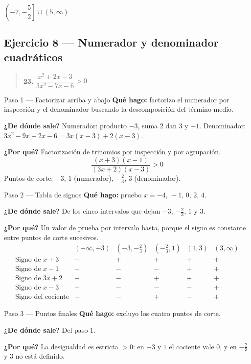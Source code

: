 \documentclass[11pt]{article}
\begin{document}
\begin{resp}
$\left(-7,-\dfrac{5}{2}\right]\cup(5,\infty)$
\end{resp}

\subsection*{Ejercicio 8 — Numerador y denominador cuadráticos}

\begin{quote}
\textbf{23.} $\dfrac{x^2+2x-3}{3x^2-7x-6}>0$
\end{quote}

\begin{paso}{Paso 1 --- Factorizar arriba y abajo}
\textbf{Qué hago:} factorizo el numerador por inspección y el denominador buscando la descomposición del término medio.

\textbf{¿De dónde sale?} Numerador: producto $-3$, suma $2$ dan $3$ y $-1$. Denominador: $3x^2-9x+2x-6=3x(x-3)+2(x-3)$.

\textbf{¿Por qué?} Factorización de trinomios por inspección y por agrupación.
\[
\frac{(x+3)(x-1)}{(3x+2)(x-3)}>0
\]
Puntos de corte: $-3$, $1$ (numerador), $-\frac23$, $3$ (denominador).
\end{paso}

\begin{paso}{Paso 2 --- Tabla de signos}
\textbf{Qué hago:} pruebo $x=-4,\,-1,\,0,\,2,\,4$.

\textbf{¿De dónde sale?} De los cinco intervalos que dejan $-3$, $-\frac23$, $1$ y $3$.

\textbf{¿Por qué?} Un valor de prueba por intervalo basta, porque el signo es constante entre puntos de corte sucesivos.
\[
\begin{array}{l|ccccc}
 & (-\infty,-3) & (-3,-\tfrac23) & (-\tfrac23,1) & (1,3) & (3,\infty)\\\hline
\text{Signo de } x+3 & - & + & + & + & +\\
\text{Signo de } x-1 & - & - & - & + & +\\
\text{Signo de } 3x+2 & - & - & + & + & +\\
\text{Signo de } x-3 & - & - & - & - & +\\\hline
\text{Signo del cociente} & + & - & + & - & +
\end{array}
\]
\end{paso}

\begin{paso}{Paso 3 --- Puntos finales}
\textbf{Qué hago:} excluyo los cuatro puntos de corte.

\textbf{¿De dónde sale?} Del paso 1.

\textbf{¿Por qué?} La desigualdad es estricta $>0$: en $-3$ y $1$ el cociente vale $0$, y en $-\frac23$ y $3$ no está definido.
\end{paso}
\end{document}
